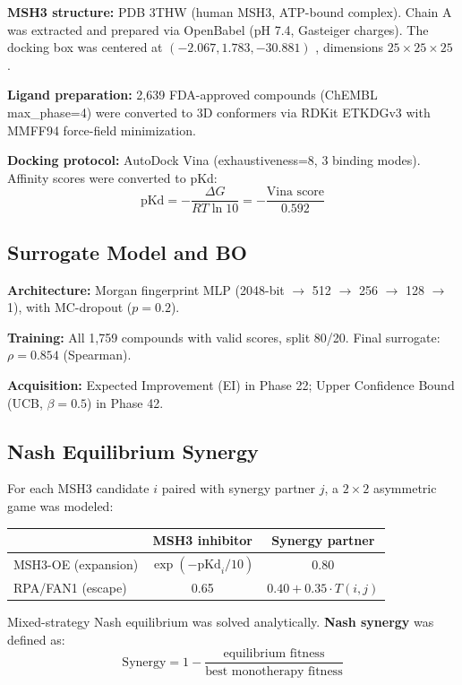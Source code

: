 \documentclass[12pt,a4paper]{article}
\begin{document}
\textbf{MSH3 structure:} PDB 3THW (human MSH3, ATP-bound complex). Chain A was extracted and prepared via OpenBabel (pH 7.4, Gasteiger charges). The docking box was centered at $(-2.067, 1.783, -30.881)$ , dimensions $25 \times 25 \times 25$ .

\textbf{Ligand preparation:} 2,639 FDA-approved compounds (ChEMBL max\_phase=4) were converted to 3D conformers via RDKit ETKDGv3 with MMFF94 force-field minimization.

\textbf{Docking protocol:} AutoDock Vina (exhaustiveness=8, 3 binding modes). Affinity scores were converted to pKd:
$$\text{pKd} = -\frac{\Delta G}{RT \ln 10} = -\frac{\text{Vina score}}{0.592}$$

\subsection{Surrogate Model and BO}

\textbf{Architecture:} Morgan fingerprint MLP (2048-bit $\to$ 512 $\to$ 256 $\to$ 128 $\to$ 1), with MC-dropout ($p=0.2$).

\textbf{Training:} All 1,759 compounds with valid scores, split 80/20. Final surrogate: $\rho = 0.854$ (Spearman).

\textbf{Acquisition:} Expected Improvement (EI) in Phase 22; Upper Confidence Bound (UCB, $\beta=0.5$) in Phase 42.

\subsection{Nash Equilibrium Synergy}

For each MSH3 candidate $i$ paired with synergy partner $j$, a $2 \times 2$ asymmetric game was modeled:

\begin{center}
\begin{tabular}{l|cc}
 & MSH3 inhibitor & Synergy partner \\
\hline
MSH3-OE (expansion) & $\exp(-\text{pKd}_i/10)$ & 0.80 \\
RPA/FAN1 (escape) & 0.65 & $0.40 + 0.35 \cdot T(i,j)$ \\
\end{tabular}
\end{center}

Mixed-strategy Nash equilibrium was solved analytically. \textbf{Nash synergy} was defined as:
$$\text{Synergy} = 1 - \frac{\text{equilibrium fitness}}{\text{best monotherapy fitness}}$$
\end{document}
